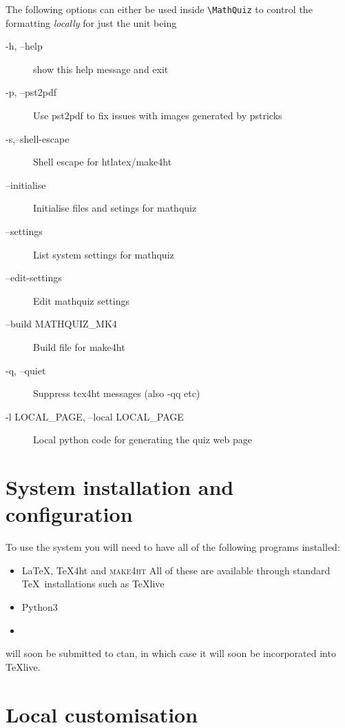\documentclass[svgnames]{article}
\begin{document}
    The following options can either be used inside \Verb|\MathQuiz| to
    control the formatting \textit{locally} for just the unit being


    \begin{description}
       \item[ -h, --help]            show this help message and exit
       \item[-p, --pst2pdf]
          Use pst2pdf to fix issues with images generated by pstricks
       \item[-s,--shell-escape]
          Shell escape for htlatex/make4ht
       \item[--initialise]
          Initialise files and setings for mathquiz
       \item[--settings]
          List system settings for mathquiz
       \item[--edit-settings]
          Edit mathquiz settings
       \item[--build MATHQUIZ\_MK4]
          Build file for make4ht
       \item[-q, --quiet]
          Suppress tex4ht messages (also -qq etc)
       \item[-l LOCAL\_PAGE, --local LOCAL\_PAGE]
          Local python code for generating the quiz web page
    \end{description}

\section{System installation and configuration}\label{S:installation}

    To use the system you will need to have all of the following programs installed:
    \begin{itemize}
         \item \LaTeX, \TeX 4ht and \textsc{make4ht}
         All of these are available through standard \TeX\ installations
         such as \TeX live
         \item Python3
         \item \MathQuiz
    \end{itemize}

    \MathQuiz will soon be submitted to ctan, in which case it will soon
    be incorporated into \TeX live.

\section{Local customisation}
\end{document}
